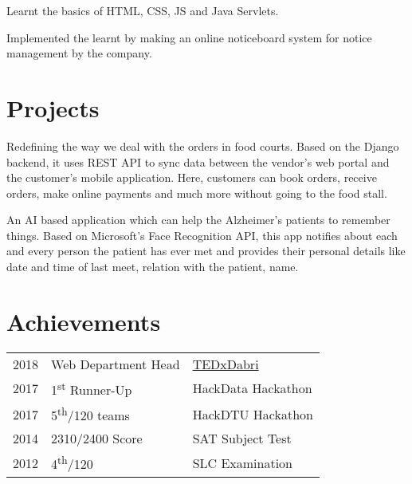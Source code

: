 \documentclass[]{openfont}
\begin{document}
\begin{minipage}[t]{0.66\textwidth}
\begin{tightemize}
\item Learnt the basics of HTML, CSS, JS and Java Servlets.
\item Implemented the learnt by making an online noticeboard system for notice management by the company.
\end{tightemize}
\sectionsep


\section{Projects}

Redefining the way we deal with the orders in food courts. Based on the Django backend, it uses REST API to sync data between the vendor's web portal and the customer's mobile application. Here, customers can book orders, receive orders, make online payments and much more without going to the food stall.
\sectionsep

An AI based application which can help the Alzheimer's patients to remember things. Based on Microsoft's Face Recognition API, this app notifies about each and every person the patient has ever met and provides their personal details like date and time of last meet, relation with the patient, name.
\sectionsep


\section{Achievements} 
\begin{tabular}{rll}
2018	     & Web Department Head  & \href{http://tedxdabri.in}{TEDxDabri}\\
2017	     & 1\textsuperscript{st} Runner-Up  & HackData Hackathon\\
2017	     & 5\textsuperscript{th}/120 teams  & HackDTU Hackathon\\
2014         & 2310/2400 Score & SAT Subject Test\\    
2012	     & 4\textsuperscript{th}/120  & SLC Examination\\

\end{tabular}
\sectionsep

\end{minipage} 
\end{document}
